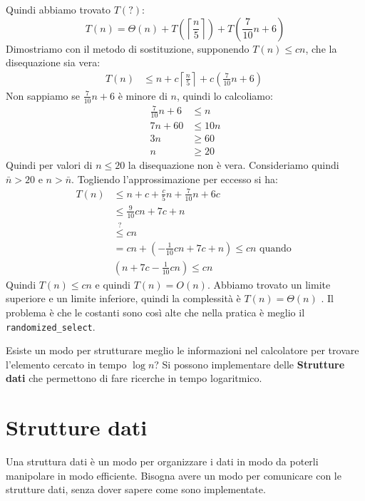 \documentclass[a4paper]{article}
\begin{document}
\begin{enumerate}
    \vspace{1em}
    \noindent
    Quindi abbiamo trovato \( T(?) \):
    \[
      T(n) = \Theta (n) + T\left(\left\lceil \frac{n}{5} \right\rceil\right) + T\left(\frac{7}{10} n + 6\right)
    \] 
    Dimostriamo con il metodo di sostituzione, supponendo \( T(n) \le cn \), che la
    disequazione sia vera:
    \[
    \begin{aligned}
      T(n) &\le n + c \left\lceil \frac{n}{5} \right\rceil + c(\frac{7}{10}n + 6) \
    \end{aligned}
    \] 
    Non sappiamo se \( \frac{7}{10}n + 6 \) è minore di \( n \), quindi lo calcoliamo:
    \[
    \begin{aligned}
      \frac{7}{10}n + 6 &\le n\\
      7n + 60 &\le 10n\\
      3n &\ge 60\\
      n &\ge 20
    \end{aligned}
    \] 
    Quindi per valori di \( n \le 20 \) la disequazione non è vera. Consideriamo quindi
    \( \bar{n} > 20 \) e \( n > \bar{n} \). Togliendo l'approssimazione per eccesso si ha:
    \[
    \begin{aligned}
      T(n) &\le n + c + \frac{c}{5}n + \frac{7}{10}n + 6c \\
           &\le \frac{9}{10}cn + 7c + n \\
           &\stackrel{?}{\le} cn \\
           &= cn + \left(-\frac{1}{10}cn + 7c + n\right) \le cn \text{ quando } \\
           & \left( n + 7c - \frac{1}{10}cn \right) \le cn
    \end{aligned}
    \] 
    Quindi \( T(n) \le cn \) e quindi \( T(n) = O(n) \). Abbiamo trovato un limite superiore
    e un limite inferiore, quindi la complessità è \( T(n) = \Theta(n) \) . Il problema è
    che le costanti sono così alte che nella pratica è meglio il
    \texttt{randomized\_select}.
\end{enumerate}

\vspace{1em}
\noindent
Esiste un modo per strutturare meglio le informazioni nel calcolatore per trovare
l'elemento cercato in tempo \( \log n \)?
Si possono implementare delle \textbf{Strutture dati} che permettono di fare
ricerche in tempo logaritmico.

\section{Strutture dati}
Una struttura dati è un modo per organizzare i dati in modo da poterli manipolare
in modo efficiente. Bisogna avere un modo per comunicare con le strutture dati, senza
dover sapere come sono implementate.
\end{document}
